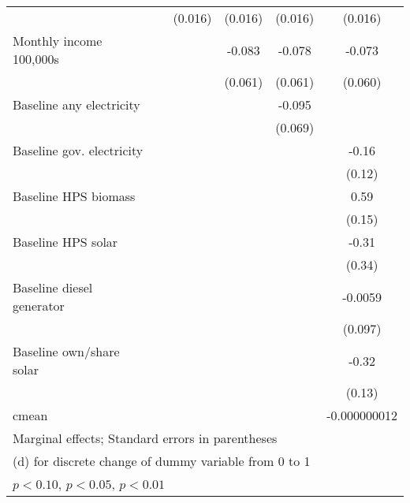 \begin{table}[htbp]
\begin{tabular*}{1\hsize}{@{\hskip\tabcolsep\extracolsep\fill}l*{5}{c}}
                &                  &  (0.016)         &  (0.016)         &  (0.016)         &  (0.016)         \\
Monthly income 100,000s&                  &                  &   -0.083         &   -0.078         &   -0.073         \\
                &                  &                  &  (0.061)         &  (0.061)         &  (0.060)         \\
Baseline any electricity&                  &                  &                  &   -0.095         &                  \\
                &                  &                  &                  &  (0.069)         &                  \\
Baseline gov. electricity&                  &                  &                  &                  &    -0.16         \\
                &                  &                  &                  &                  &   (0.12)         \\
Baseline HPS biomass&                  &                  &                  &                  &     0.59\sym{***}\\
                &                  &                  &                  &                  &   (0.15)         \\
Baseline HPS solar&                  &                  &                  &                  &    -0.31         \\
                &                  &                  &                  &                  &   (0.34)         \\
Baseline diesel generator&                  &                  &                  &                  &  -0.0059         \\
                &                  &                  &                  &                  &  (0.097)         \\
Baseline own/share solar&                  &                  &                  &                  &    -0.32\sym{**} \\
                &                  &                  &                  &                  &   (0.13)         \\
\midrule
cmean           &                  &                  &                  &                  &-0.000000012         \\
\bottomrule
\multicolumn{6}{l}{\footnotesize Marginal effects; Standard errors in parentheses}\\
\multicolumn{6}{l}{\footnotesize  (d) for discrete change of dummy variable from 0 to 1}\\
\multicolumn{6}{l}{\footnotesize \sym{*} \(p<0.10\), \sym{**} \(p<0.05\), \sym{***} \(p<0.01\)}\\
\end{tabular*}
\end{table}
